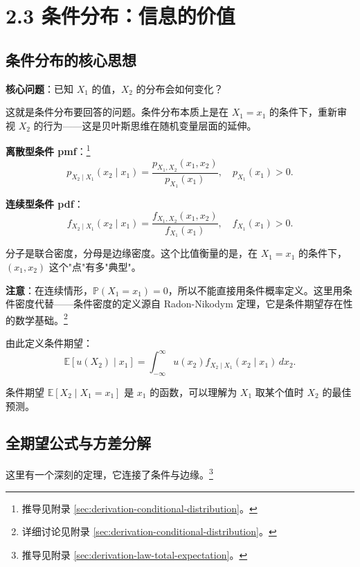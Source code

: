 \section{2.3 条件分布：信息的价值}\label{sec:2.3}

\subsection{条件分布的核心思想}

\textbf{核心问题}：已知 $X_1$ 的值，$X_2$ 的分布会如何变化？

这就是条件分布要回答的问题。条件分布本质上是在 $X_1 = x_1$ 的条件下，重新审视 $X_2$ 的行为——这是贝叶斯思维在随机变量层面的延伸。

\textbf{离散型条件 pmf}：\footnote{推导见附录 \cref{sec:derivation-conditional-distribution}。}
\begin{equation}\label{eq:conditional-pmf-ch2}
p_{X_2 \mid X_1}(x_2 \mid x_1) = \frac{p_{X_1, X_2}(x_1, x_2)}{p_{X_1}(x_1)}, \quad p_{X_1}(x_1) > 0.
\end{equation}

\textbf{连续型条件 pdf}：
\begin{equation}\label{eq:conditional-pdf-ch2}
f_{X_2 \mid X_1}(x_2 \mid x_1) = \frac{f_{X_1, X_2}(x_1, x_2)}{f_{X_1}(x_1)}, \quad f_{X_1}(x_1) > 0.
\end{equation}

分子是联合密度，分母是边缘密度。这个比值衡量的是，在 $X_1 = x_1$ 的条件下，$(x_1, x_2)$ 这个"点"有多"典型"。

\textbf{注意}：在连续情形，$\mathbb{P}(X_1 = x_1) = 0$，所以不能直接用条件概率定义。这里用条件密度代替——条件密度的定义源自 Radon-Nikodym 定理，它是条件期望存在性的数学基础。\footnote{详细讨论见附录 \cref{sec:derivation-conditional-distribution}。}

由此定义条件期望：
\begin{equation}\label{eq:conditional-expectation-ch2}
\mathbb{E}[u(X_2) \mid x_1] = \int_{-\infty}^{\infty} u(x_2) f_{X_2 \mid X_1}(x_2 \mid x_1) \, dx_2.
\end{equation}

条件期望 $\mathbb{E}[X_2 \mid X_1 = x_1]$ 是 $x_1$ 的函数，可以理解为 $X_1$ 取某个值时 $X_2$ 的最佳预测。

\subsection{全期望公式与方差分解}

这里有一个深刻的定理，它连接了条件与边缘。\footnote{推导见附录 \cref{sec:derivation-law-total-expectation}。}

